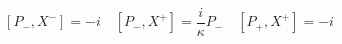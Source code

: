 \begin{equation}\label{11b}
\left[P_{-},X^{-}\right]= -i\quad
\left[P_{-},X^{+}\right]=\frac{i}{\kappa}P_-\quad
\left[P_{+},X^{+}\right]=-i
\end{equation}

